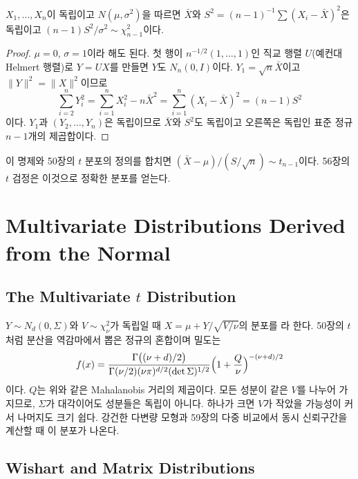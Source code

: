 \begin{proposition}
\label{prop:mean-variance-independent}
$X_1,\dots,X_n$이 독립이고 $N(\mu,\sigma^2)$을 따르면 $\bar X$와 $S^2=(n-1)^{-1}\sum(X_i-\bar X)^2$은 독립이고 $(n-1)S^2/\sigma^2\sim\chi^2_{n-1}$이다.
\end{proposition}

\begin{proof}
$\mu=0$, $\sigma=1$이라 해도 된다. 첫 행이 $n^{-1/2}(1,\dots,1)$인 직교 행렬 $U$(예컨대 Helmert 행렬)로 $Y=UX$를 만들면 $Y$도 $N_n(0,I)$이다. $Y_1=\sqrt n\bar X$이고 $\|Y\|^2=\|X\|^2$이므로
\[
\sum_{i=2}^nY_i^2=\sum_{i=1}^nX_i^2-n\bar X^2=\sum_{i=1}^n(X_i-\bar X)^2=(n-1)S^2
\]
이다. $Y_1$과 $(Y_2,\dots,Y_n)$은 독립이므로 $\bar X$와 $S^2$도 독립이고 오른쪽은 독립인 표준 정규 $n-1$개의 제곱합이다.
\end{proof}

이 명제와 50장의 $t$ 분포의 정의를 합치면 $(\bar X-\mu)/(S/\sqrt n)\sim t_{n-1}$이다. 56장의 $t$ 검정은 이것으로 정확한 분포를 얻는다.

\section{Multivariate Distributions Derived from the Normal}
\label{sec:mv-families}

\subsection{The Multivariate $t$ Distribution}

$Y\sim N_d(0,\Sigma)$와 $V\sim\chi^2_\nu$가 독립일 때 $X=\mu+Y/\sqrt{V/\nu}$의 분포를 라 한다. 50장의 $t$처럼 분산을 역감마에서 뽑은 정규의 혼합이며 밀도는
\[
f(x)=\frac{\Gamma\bigl((\nu+d)/2\bigr)}{\Gamma(\nu/2)(\nu\pi)^{d/2}(\det\Sigma)^{1/2}}\Bigl(1+\frac Q\nu\Bigr)^{-(\nu+d)/2}
\]
이다. $Q$는 위와 같은 Mahalanobis 거리의 제곱이다. 모든 성분이 같은 $V$를 나누어 가지므로, $\Sigma$가 대각이어도 성분들은 독립이 아니다. 하나가 크면 $V$가 작았을 가능성이 커서 나머지도 크기 쉽다. 강건한 다변량 모형과 59장의 다중 비교에서 동시 신뢰구간을 계산할 때 이 분포가 나온다.

\subsection{Wishart and Matrix Distributions}

